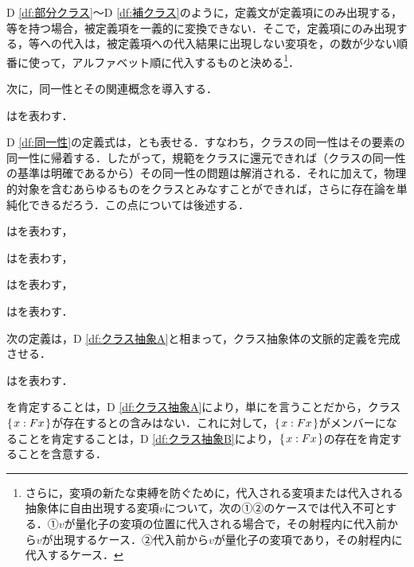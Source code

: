 D \ref{df:部分クラス}〜D \ref{df:補クラス}のように，定義文が定義項にのみ出現する，等を持つ場合，被定義項を一義的に変換できない．そこで，定義項にのみ出現する，等への代入は，被定義項への代入結果に出現しない変項を，の数が少ない順番に使って，アルファベット順に代入するものと決める\footnote{
    さらに，変項の新たな束縛を防ぐために，代入される変項または代入される抽象体に自由出現する変項$v$について，次の①②のケースでは代入不可とする．①$v$が量化子の変項の位置に代入される場合で，その射程内に代入前から$v$が出現するケース．②代入前から$v$が量化子の変項であり，その射程内に代入するケース．
}．

次に，同一性とその関連概念を導入する．

\begin{df}[同一性]
\label{df:同一性}
\kagi{$
    \alpha = \beta
$}は\kagi{$
    \alpha\subseteq\beta\subseteq\alpha
$}を表わす．
\end{df}
\noindent D \ref{df:同一性}の定義式は，とも表せる．すなわち，クラスの同一性はその要素の同一性に帰着する．したがって，規範をクラスに還元できれば（クラスの同一性の基準は明確であるから）その同一性の問題は解消される．それに加えて，物理的対象を含むあらゆるものをクラスとみなすことができれば，さらに存在論を単純化できるだろう．この点については後述する．

\begin{df}[空クラス]
\label{df:空クラス}
\kagi{$
    \Lambda
$}はを表わす，
\end{df}

\begin{df}[普遍クラス]
\label{df:普遍クラス}
\kagi{$
    \univ
$}はを表わす，
\end{df}

\begin{df}[単一クラス]
\label{df:単一クラス}
\kagi{$
    \classab{\alpha}
$}はを表わす，
\end{df}

\begin{df}[対クラス]
\label{df:対クラス}
\kagi{$
    \classab{\alpha,\beta}
$}は\kagi{$
    \classab{\alpha}\cup\classab{\beta}
$}を表わす．
\end{df}

次の定義は，D \ref{df:クラス抽象A}と相まって，クラス抽象体の文脈的定義を完成させる．

\begin{df}
\label{df:クラス抽象B}
はを表わす．
\end{df}
\noindent{}を肯定することは，D \ref{df:クラス抽象A}により，単にを言うことだから，クラス$\{\mspace{2mu}x:Fx\mspace{2mu}\}$が存在するとの含みはない．これに対して，$ \{\mspace{2mu}x:Fx\mspace{2mu}\} $がメンバーになることを肯定することは，D \ref{df:クラス抽象B}により，$ \{\mspace{2mu}x:Fx\mspace{2mu}\} $の存在を肯定することを含意する．

